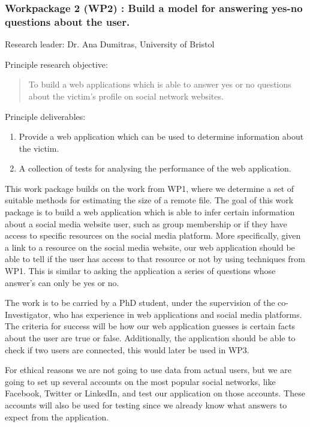 \documentclass[a4paper,11pt]{article}
\begin{document}
\subsubsection*{Workpackage 2 (WP2) : Build a model for answering yes-no questions about the user.}
Research leader: Dr. Ana Dumitras, University of Bristol

Principle research objective:
\begin{quote}
	To build a web applications which is able to answer yes or no questions about the victim's profile on social network websites.
\end{quote}

Principle deliverables:
\begin{enumerate}
\item Provide a web application which can be used to determine information about the victim.
\item A collection of tests for analysing the performance of the web application.
\end{enumerate}

This work package builds on the work from WP1, where we determine a set of suitable methods for estimating the size of a remote file. The goal of this work package is to build a web application which is able to infer certain information about a social media website user, such as group membership or if they have access to specific resources on the social media platform. More specifically, given a link to a resource on the social media website, our web application should be able to tell if the user has access to that resource or not by using techniques from WP1. This is similar to asking the application a series of questions whose answer's can only be yes or no.

The work is to be carried by a PhD student, under the supervision of the co-Investigator, who has experience in web applications and social media platforms. The criteria for success will be how  our web application guesses is certain facts about the user are true or false. Additionally, the application should be able to check if two users are connected, this would later be used in WP3. 

For ethical reasons we are not going to use data from actual users, but we are going to set up several accounts on the most popular social networks, like Facebook, Twitter or LinkedIn, and test our application on those accounts. These accounts will also be used for testing since we already know what answers to expect from the application.
\end{document}
